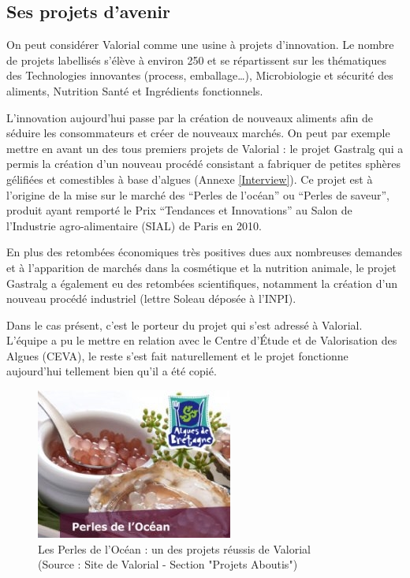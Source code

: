\documentclass[a4paper,12pt]{report}
\begin{document}
		\subsection{Ses projets d'avenir}
				On peut considérer Valorial comme une usine à projets d’innovation. Le nombre de projets labellisés s’élève à environ 250 et se répartissent sur les thématiques des Technologies innovantes (process, emballage…), Microbiologie et sécurité des aliments, Nutrition Santé et Ingrédients fonctionnels\cite{ProjetsAboutis}.

   				L’innovation aujourd’hui passe par la création de nouveaux aliments afin de séduire les consommateurs et créer de nouveaux marchés. On peut par exemple mettre en avant un des tous premiers projets de Valorial : le projet Gastralg qui a permis la création d’un nouveau procédé consistant a fabriquer de petites sphères gélifiées et comestibles à base d’algues (Annexe \ref{Interview}). Ce projet est à l’origine de la mise sur le marché des  “Perles de l’océan” ou “Perles de saveur”, produit ayant remporté le Prix “Tendances et Innovations” au Salon de l’Industrie agro-alimentaire (SIAL) de Paris en 2010.
    
				En plus des retombées économiques très positives dues aux nombreuses demandes et à l’apparition de marchés dans la cosmétique et la nutrition animale, le projet Gastralg a également eu des retombées scientifiques, notamment la création d’un nouveau procédé industriel (lettre Soleau déposée à l’INPI).

	Dans le cas présent, c’est le porteur du projet qui s’est adressé à Valorial. L’équipe a pu le mettre en relation avec le Centre d’Étude et de Valorisation des Algues (CEVA), le reste s’est fait naturellement et le projet fonctionne aujourd’hui tellement bien qu’il a été copié.

\begin{figure}[!h]
			\centering
			\includegraphics[scale=0.5]{Illustrations/PerlesOcean.jpg}
			\caption{Les Perles de l'Océan : un des projets réussis de Valorial\\(Source : Site de Valorial - Section "Projets Aboutis"\cite{ProjetsAboutis})}
			\label{PerlesOcean}
			\end{figure}
\end{document}

